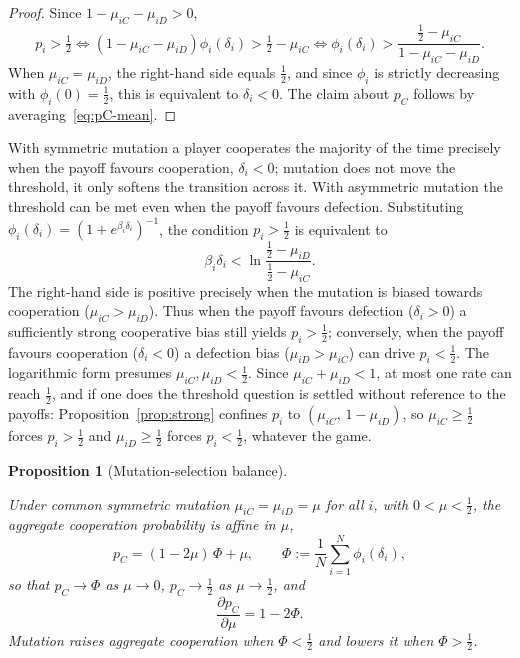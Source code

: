 \documentclass[11pt]{article}
\newtheorem{proposition}{Proposition}
\newcommand{\pC}{p_C}
\begin{document}
\begin{proof}

Since \(1-\mu_{iC}-\mu_{iD}>0\),
\[
  p_i > \tfrac{1}{2}
  \iff (1-\mu_{iC}-\mu_{iD})\phi_i(\delta_i) > \tfrac{1}{2}-\mu_{iC}
  \iff \phi_i(\delta_i) > \frac{\tfrac{1}{2}-\mu_{iC}}{1-\mu_{iC}-\mu_{iD}}.
\]
When \(\mu_{iC}=\mu_{iD}\), the right-hand side equals \(\tfrac{1}{2}\), and since
\(\phi_i\) is strictly decreasing with \(\phi_i(0)=\tfrac{1}{2}\), this is equivalent
to \(\delta_i<0\). The claim about \(\pC\) follows by averaging~\eqref{eq:pC-mean}.

\end{proof}

With symmetric mutation a player cooperates the majority of the time precisely when the
payoff favours cooperation, \(\delta_i<0\); mutation does not move the threshold, it
only
softens the transition across it. With asymmetric mutation the threshold can be met even
when the payoff favours defection. Substituting
\(\phi_i(\delta_i)=(1+e^{\beta_i\delta_i})^{-1}\), the condition \(p_i>\tfrac{1}{2}\) is
equivalent to
\[
  \beta_i\delta_i < \ln\frac{\tfrac{1}{2}-\mu_{iD}}{\tfrac{1}{2}-\mu_{iC}}.
\]
The right-hand side is positive precisely when the mutation is biased towards
cooperation
(\(\mu_{iC}>\mu_{iD}\)). Thus when the payoff favours defection (\(\delta_i>0\)) a
sufficiently strong cooperative bias still yields \(p_i>\tfrac{1}{2}\); conversely, when
the payoff favours cooperation (\(\delta_i<0\)) a defection bias (\(\mu_{iD}>\mu_{iC}\))
can drive \(p_i<\tfrac{1}{2}\). The logarithmic form presumes
\(\mu_{iC},\mu_{iD}<\tfrac{1}{2}\). Since \(\mu_{iC}+\mu_{iD}<1\), at most
one rate can reach \(\tfrac{1}{2}\), and if one does the threshold question
is settled without reference to the payoffs:
Proposition~\ref{prop:strong} confines \(p_i\) to
\((\mu_{iC},\,1-\mu_{iD})\), so \(\mu_{iC}\ge\tfrac{1}{2}\) forces
\(p_i>\tfrac{1}{2}\) and \(\mu_{iD}\ge\tfrac{1}{2}\) forces
\(p_i<\tfrac{1}{2}\), whatever the game.

\begin{proposition}[Mutation-selection balance]\label{prop:balance}

Under common symmetric mutation \(\mu_{iC}=\mu_{iD}=\mu\) for all \(i\), with
\(0<\mu<\tfrac{1}{2}\), the aggregate cooperation probability is affine in \(\mu\),
\[
  \pC = (1-2\mu)\,\Phi + \mu, \qquad
  \Phi := \frac{1}{N}\sum_{i=1}^{N}\phi_i(\delta_i),
\]
so that \(\pC\to\Phi\) as \(\mu\to0\), \(\pC\to\tfrac{1}{2}\) as
\(\mu\to\tfrac{1}{2}\), and
\[
  \frac{\partial\pC}{\partial\mu} = 1-2\Phi.
\]
Mutation raises aggregate cooperation when \(\Phi<\tfrac{1}{2}\) and lowers it when
\(\Phi>\tfrac{1}{2}\).

\end{proposition}
\end{document}
